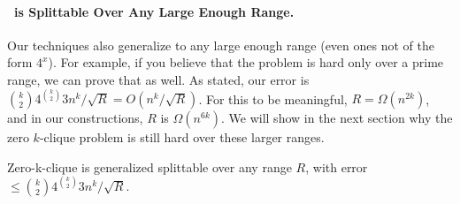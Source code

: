 \paragraph{\zkclique~is Splittable Over Any Large Enough Range.}\label{sec:zkcsplittable}
Our techniques also generalize to any large enough range (even ones not of the form $4^x$). For example, if you believe that the problem is hard only over a prime range, we can prove that as well. As stated, our error is $\binom{k}{2}4^{\binom{k}{2}}3 n^k/\sqrt{R} = O(n^k/\sqrt R)$. For this to be meaningful, $R = \Omega(n^{2k})$, and in our constructions, $R$ is $\Omega(n^{6k})$. We will show in the next section why the zero $k$-clique problem is still hard over these larger ranges.

\begin{theorem}
	Zero-k-clique is generalized splittable over any range $R$, with error $\leq \binom{k}{2}4^{\binom{k}{2}}3 n^k/\sqrt{R}$. 
	\label{thm:zkcsplittable}
\end{theorem}

